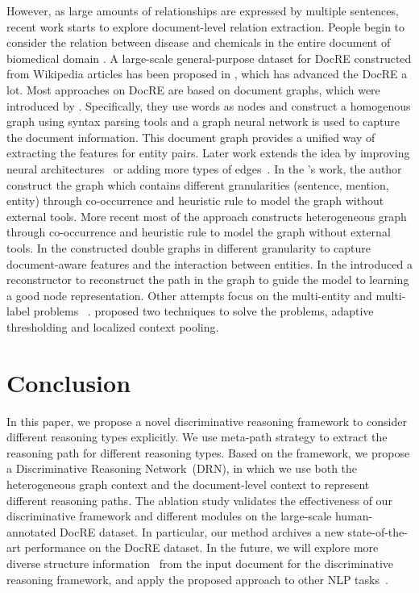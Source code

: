 \documentclass[11pt,a4paper]{article}
\begin{document}
However, as large amounts of relationships are expressed by multiple sentences, recent work starts to explore document-level relation extraction.
People begin to consider the relation between disease and chemicals in the entire document of biomedical domain \cite{quirk-poon-2017-distant,DBLP:journals/corr/abs-1810-05102,zhang-etal-2018-graph,Christopoulou2019ConnectingTD,zhu-etal-2019-graph}.
A large-scale general-purpose dataset for DocRE constructed from Wikipedia articles has been proposed in \cite{yao-etal-2019-docred}, which has advanced the DocRE a lot.
Most approaches on DocRE are based on document graphs, which were introduced by \citeauthor{quirk-poon-2017-distant}. Specifically, they use words as nodes and construct a homogenous graph using syntax parsing tools and a graph neural network is used to capture the document information. 
This document graph provides a unified way of extracting the features for entity pairs. 
Later work extends the idea by improving neural architectures~\cite{DBLP:journals/tacl/PengPQTY17,verga-etal-2018-simultaneously,DBLP:journals/corr/abs-1810-05102} or adding more types of edges~\cite{Christopoulou2019ConnectingTD}.
In the \citeauthor{Christopoulou2019ConnectingTD}'s work, the author construct the graph which contains different granularities (sentence, mention, entity) through co-occurrence and heuristic rule to model the graph without external tools.
More recent most of the approach \cite{Christopoulou2019ConnectingTD,zeng-etal-2020-double,docred-rec} constructs heterogeneous graph through co-occurrence and heuristic rule to model the graph without external tools.
In the \cite{zeng-etal-2020-double} constructed double graphs in different granularity to capture document-aware features and the interaction between entities.
In the \cite{docred-rec} introduced a reconstructor to reconstruct the path in the graph to guide the model to learning a good node representation.
Other attempts focus on the multi-entity and multi-label problems ~\cite{zhou2021atlop}. \citeauthor{zhou2021atlop} proposed two techniques to solve the problems, adaptive thresholding and localized context pooling. 
\section{Conclusion}
In this paper, we propose a novel discriminative reasoning framework to consider different reasoning types explicitly. 
We use meta-path strategy to extract the reasoning path for different reasoning types.
Based on the framework, we propose a Discriminative Reasoning Network~(DRN), in which we use both the heterogeneous graph context and the document-level context to represent different reasoning paths. 
The ablation study validates the effectiveness of our discriminative framework and different modules on the large-scale human-annotated DocRE dataset.
In particular, our method archives a new state-of-the-art performance on the DocRE dataset.
In the future, we will explore more diverse structure information~\cite{AAAI1816060,9097389,Cohen2020Scalable} from the input document for the discriminative reasoning framework, and apply the proposed approach to other NLP tasks~\cite{zhang-etal-2020-two,chen-etal-2020-aspect,zhang2020sg}.  
\end{document}
